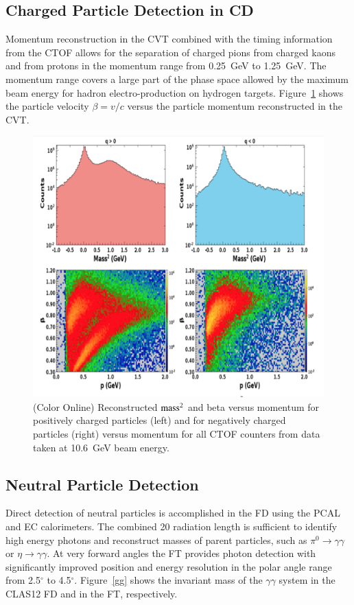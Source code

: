 \documentclass[final,3p,twocolumn]{elsarticle}
\begin{document}
\subsection{Charged Particle Detection in CD} 

Momentum reconstruction in the CVT combined with the timing information from the CTOF allows for the separation 
of charged pions from charged kaons and from protons in the momentum range from 0.25~GeV to 1.25~GeV. The momentum
range covers a large part of the phase space allowed by the maximum beam energy for hadron electro-production 
on hydrogen targets. Figure~\ref{CD-PID} shows the particle velocity $\beta = v/c$ versus the particle momentum 
reconstructed in the CVT.

\begin{figure}[htbp!]
\centerline{\includegraphics[width=1.0\columnwidth]{CTOF-PID.png}}
\caption{(Color Online) Reconstructed $\rm mass^2$ and beta versus momentum for positively charged particles (left) and for
negatively charged particles (right) versus momentum for all CTOF counters from data taken at 10.6~GeV beam energy.}
\label{CD-PID}
\end{figure} 

\subsection{Neutral Particle Detection} 

Direct detection of neutral particles is accomplished in the FD using the PCAL and EC calorimeters. The combined
20 radiation length is sufficient to identify high energy photons and reconstruct masses of parent particles, such
as $\pi^0\to \gamma \gamma$  or $\eta \to \gamma \gamma$. At very forward angles the FT provides photon
detection with significantly improved position and energy resolution in the polar angle range from 2.5$^\circ$ to
4.5$^\circ$. Figure~\ref{gg} shows the invariant mass of the $\gamma\gamma$ system in the CLAS12 FD and in
the FT, respectively. 
\end{document}
